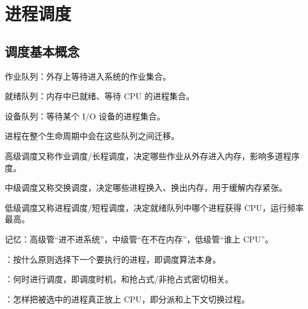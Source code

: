\chapter{进程调度}

\section{调度基本概念}
\begin{points}
  \item 作业队列：外存上等待进入系统的作业集合。
  \item 就绪队列：内存中已就绪、等待 CPU 的进程集合。
  \item 设备队列：等待某个 I/O 设备的进程集合。
  \item 进程在整个生命周期中会在这些队列之间迁移。
\end{points}


\begin{points}
  \item 高级调度又称作业调度/长程调度，决定哪些作业从外存进入内存，影响多道程序度。
  \item 中级调度又称交换调度，决定哪些进程换入、换出内存，用于缓解内存紧张。
  \item 低级调度又称进程调度/短程调度，决定就绪队列中哪个进程获得 CPU，运行频率最高。
  \item 记忆：高级管“进不进系统”，中级管“在不在内存”，低级管“谁上 CPU”。
\end{points}


\begin{points}
  \item {}：按什么原则选择下一个要执行的进程，即调度算法本身。
  \item {}：何时进行调度，即调度时机，和抢占式/非抢占式密切相关。
  \item {}：怎样把被选中的进程真正放上 CPU，即分派和上下文切换过程。
\end{points}


